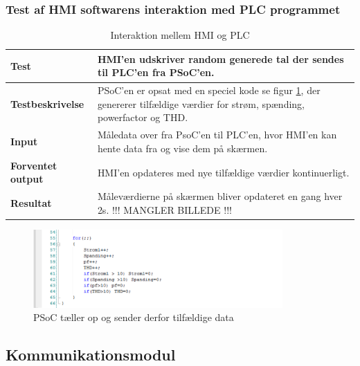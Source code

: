 \subsubsection{Test af HMI softwarens interaktion med PLC programmet}
\begin{table}[H]
	\centering
	\begin{tabular}{ | m{} | m{}|} 
		\hline
		\textbf{Test}					&HMI'en udskriver random generede tal der sendes til PLC'en fra PSoC'en. \\ \hline
		\textbf{Testbeskrivelse}		&PSoC'en er opsat med en speciel kode se figur \ref{fig:PSoCkodeeksempel}, der genererer tilfældige værdier for strøm, spænding, powerfactor og THD.  \\ \hline
		\textbf{Input}					& Måledata over fra PsoC'en til PLC'en, hvor HMI'en kan hente data fra og vise dem på skærmen.\\ \hline
		\textbf{Forventet output}		&HMI'en opdateres med nye tilfældige værdier kontinuerligt.\\ \hline
		\textbf{Resultat}				&Måleværdierne på skærmen bliver opdateret en gang hver 2s.  !!! MANGLER BILLEDE !!!\\ \hline
	\end{tabular}
	\caption{Interaktion mellem HMI og PLC} 
	\label{tab:HMIogPLC}
\end{table}

\begin{figure}[H] %
	\centering
	\includegraphics[width=0.85\textwidth]{Test/ModultestStyringsenhed/PSoCkodeeksempel}
	\caption{PSoC tæller op og sender derfor tilfældige data}
	\label{fig:PSoCkodeeksempel}
\end{figure}


\subsection{Kommunikationsmodul}

